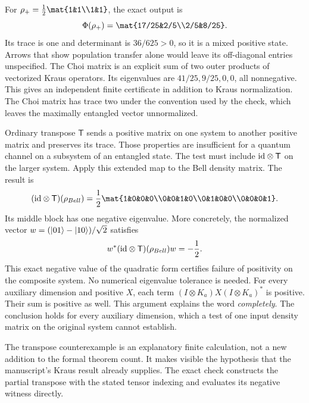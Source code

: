 For $\rho_+=\frac12\mat{1&1\\1&1}$, the exact output is
\[
\Phi(\rho_+)=\mat{17/25&2/5\\2/5&8/25}.
\]
Its trace is one and determinant is $36/625>0$, so it is a mixed positive state. Arrows that show population transfer alone would leave its off-diagonal entries unspecified.
The Choi matrix is an explicit sum of two outer products of vectorized Kraus operators. Its eigenvalues are $41/25,9/25,0,0$, all nonnegative. This gives an independent finite certificate in addition to Kraus normalization. The Choi matrix has trace two under the convention used by the check, which leaves the maximally entangled vector unnormalized.

Ordinary transpose $\mathsf T$ sends a positive matrix on one system to another positive matrix and preserves its trace. Those properties are insufficient for a quantum channel on a subsystem of an entangled state. The test must include $\id\otimes\mathsf T$ on the larger system.
Apply this extended map to the Bell density matrix. The result is
\[
(\id\otimes\mathsf T)(\rho_{\rm Bell})
=\frac12\mat{1&0&0&0\\0&0&1&0\\0&1&0&0\\0&0&0&1}.
\]
Its middle block has one negative eigenvalue. More concretely, the normalized vector $w=(\left|01\right\rangle-\left|10\right\rangle)/\sqrt2$ satisfies
\[
w^*(\id\otimes\mathsf T)(\rho_{\rm Bell})w=-\frac12.
\]
This exact negative value of the quadratic form certifies failure of positivity on the composite system. No numerical eigenvalue tolerance is needed.
For every auxiliary dimension and positive $X$, each term $(I\otimes K_a)X(I\otimes K_a)^*$ is positive. Their sum is positive as well. This argument explains the word \emph{completely}. The conclusion holds for every auxiliary dimension, which a test of one input density matrix on the original system cannot establish.

The transpose counterexample is an explanatory finite calculation, not a new addition to the formal theorem count. It makes visible the hypothesis that the manuscript's Kraus result already supplies. The exact check constructs the partial transpose with the stated tensor indexing and evaluates its negative witness directly.

